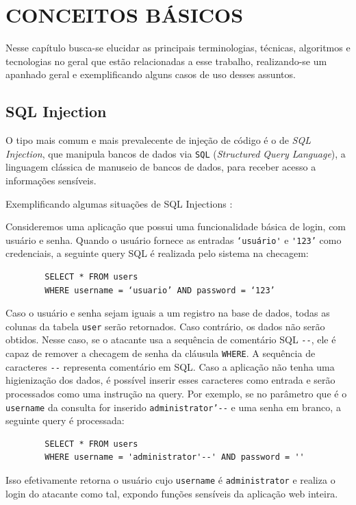 \chapter{CONCEITOS BÁSICOS\textbf{}}
\label{chp:capitulo2}

Nesse capítulo busca-se elucidar as principais terminologias, técnicas, algoritmos e tecnologias no geral que estão relacionadas a esse trabalho, realizando-se um apanhado geral e exemplificando alguns casos de uso desses assuntos.

\section{SQL Injection}

O tipo mais comum e mais prevalecente de injeção de código é o de \textit{SQL Injection}, que manipula bancos de dados via \verb+SQL+ (\textit{Structured Query Language}), a linguagem clássica de manuseio de bancos de dados, para receber acesso a informações sensíveis.

Exemplificando algumas situações de SQL Injections \cite{sql_port_swigger}:

\begin{alineas}
    \item 
    Consideremos uma aplicação que possui uma funcionalidade básica de login, com usuário e senha. Quando o usuário fornece as entradas \verb+‘usuário'+ e \verb+'123’+ como credenciais, a seguinte query SQL é realizada pelo sistema na checagem:
    
    \begin{verbatim}
        SELECT * FROM users 
        WHERE username = ‘usuario’ AND password = ‘123’
    \end{verbatim}
    
    Caso o usuário e senha sejam iguais a um registro na base de dados, todas as colunas da tabela \verb+user+ serão retornados. Caso contrário, os dados não serão obtidos.
    Nesse caso, se o atacante usa a sequência de comentário SQL \verb+--+, ele é capaz de remover a checagem de senha da cláusula \verb+WHERE+.
    A sequência de caracteres \verb+--+ representa comentário em SQL. Caso a aplicação não tenha uma higienização dos dados, é possível inserir esses caracteres como entrada e serão processados como uma instrução na query. Por exemplo, se no parâmetro que é o \verb+username+ da consulta for inserido \verb+administrator’--+ e uma senha em branco, a seguinte query é processada:
    
    \begin{verbatim}
        SELECT * FROM users 
        WHERE username = 'administrator'--' AND password = '' 
    \end{verbatim}
    
    Isso efetivamente retorna o usuário cujo \verb+username+ é \verb+administrator+ e realiza o login do atacante como tal, expondo funções sensíveis da aplicação web inteira.

\end{alineas}

